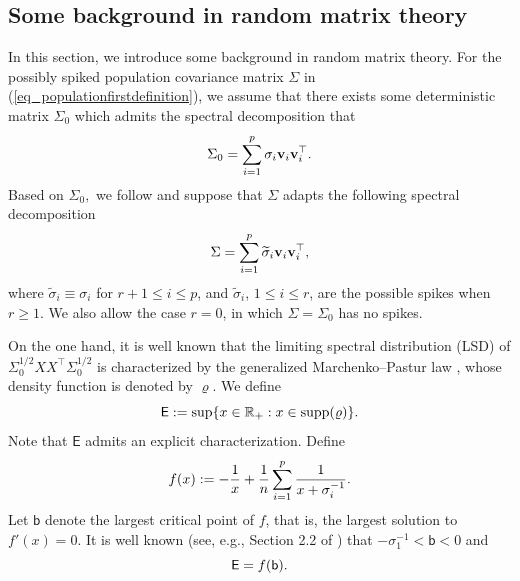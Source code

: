 \documentclass[12pt]{article}
\def\bv{\mathbf{v}}
\theoremstyle{plain}
\numberwithin{equation}{section}
\begin{document}
\subsection{Some background in random matrix theory}\label{sec_background}
In this section, we introduce some background in random matrix theory. For the possibly spiked population covariance matrix $\Sigma$ in (\ref{eq_populationfirstdefinition}), we assume that there exists some deterministic matrix $\Sigma_0$ which admits the spectral decomposition that \vspace*{-10pt}
\begin{equation}\label{eq_basepopulationcovariancematrix}
	\vspace*{-10pt}
	\Sigma_0=\sum_{i=1}^p \sigma_i \bv_i \bv_i^\top. 
\end{equation}
Based on $\Sigma_0,$ we follow \citep{ding2021spiked,ding2024eigenvector} and suppose that $\Sigma$ adapts the following spectral decomposition  \vspace*{-10pt}
\begin{equation}\label{eq_spikedmatrix}
	\vspace*{-10pt}
	\Sigma=\sum_{i=1}^p \widetilde{\sigma}_i \bv_i \bv_i^\top,
\end{equation}
where $\widetilde{\sigma}_i \equiv \sigma_i$ for $r+1 \leq i \leq p$, and $\widetilde{\sigma}_i$, $1 \leq i \leq r$, are the possible spikes when $r\geq 1$. We also allow the case $r=0$, in which $\Sigma=\Sigma_0$ has no spikes. 


On the one hand, it is well known that the limiting  spectral distribution (LSD) of  $\Sigma_0^{1/2}XX^\top \Sigma_0^{1/2}$ is characterized by the generalized Marchenko–Pastur law \citep{BaiSilverstein2010}, whose density function is denoted by $\varrho$. We define\vspace*{-10pt}
\begin{equation}\label{eq_edgeonehaa}
	\vspace*{-10pt}
	\mathsf{E} := \sup\{ x \in \mathbb{R}_+ : x \in \operatorname{supp}(\varrho) \}.
\end{equation}
Note that $\mathsf{E}$ admits an explicit characterization. Define \vspace*{-10pt}
\begin{equation}\label{eq_mp}
	\vspace*{-10pt}
	f(x) := -\frac{1}{x} + \frac{1}{n} \sum_{i=1}^p \frac{1}{x + \sigma_i^{-1}}.
\end{equation}
Let $\mathsf{b}$ denote the largest critical point of $f$, that is, the largest solution to $f'(x)=0$. It is well known (see, e.g., Section 2.2 of \citep{knowles2017anisotropic}) that $-\sigma_1^{-1} < \mathsf{b} < 0$ and \vspace*{-10pt}
\begin{equation}\label{eq:edge}
	\vspace*{-10pt}
	\mathsf{E} = f(\mathsf{b}).
\end{equation}
\end{document}

